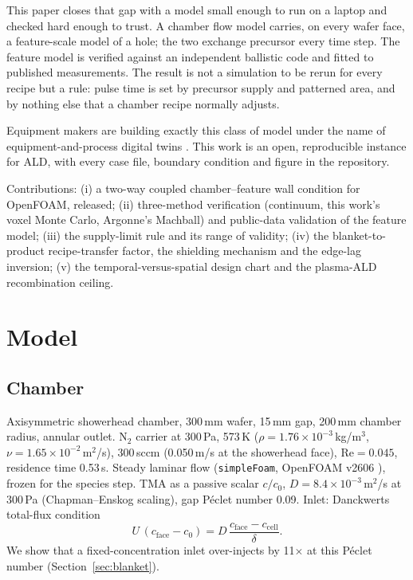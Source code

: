 \documentclass[11pt,letterpaper]{article}
\begin{document}
This paper closes that gap with a model small enough to run on a laptop and checked hard enough to trust. A chamber flow model carries, on every wafer face, a feature-scale model of a hole; the two exchange precursor every time step. The feature model is verified against an independent ballistic code and fitted to published measurements. The result is not a simulation to be rerun for every recipe but a rule: pulse time is set by precursor supply and patterned area, and by nothing else that a chamber recipe normally adjusts.

Equipment makers are building exactly this class of model under the name of equipment-and-process digital twins \cite{amat_blog}. This work is an open, reproducible instance for ALD, with every case file, boundary condition and figure in the repository.

Contributions: (i) a two-way coupled chamber--feature wall condition for OpenFOAM, released; (ii) three-method verification (continuum, this work's voxel Monte Carlo, Argonne's Machball) and public-data validation of the feature model; (iii) the supply-limit rule and its range of validity; (iv) the blanket-to-product recipe-transfer factor, the shielding mechanism and the edge-lag inversion; (v) the temporal-versus-spatial design chart and the plasma-ALD recombination ceiling.

\section{Model}

\subsection{Chamber}
Axisymmetric showerhead chamber, 300\,mm wafer, 15\,mm gap, 200\,mm chamber radius, annular outlet. N$_2$ carrier at 300\,Pa, 573\,K ($\rho = 1.76\times10^{-3}$\,kg/m$^3$, $\nu = 1.65\times10^{-2}$\,m$^2$/s), 300\,sccm (0.050\,m/s at the showerhead face), $\mathrm{Re} = 0.045$, residence time 0.53\,s. Steady laminar flow (\texttt{simpleFoam}, OpenFOAM v2606 \cite{openfoam}), frozen for the species step. TMA as a passive scalar $c/c_0$, $D = 8.4\times10^{-3}$\,m$^2$/s at 300\,Pa (Chapman--Enskog scaling), gap P\'eclet number 0.09. Inlet: Danckwerts total-flux condition
\begin{equation}
U\,(c_{\mathrm{face}} - c_0) = D\,\frac{c_{\mathrm{face}} - c_{\mathrm{cell}}}{\delta}.
\end{equation}
We show that a fixed-concentration inlet over-injects by 11$\times$ at this P\'eclet number (Section~\ref{sec:blanket}).
\end{document}
